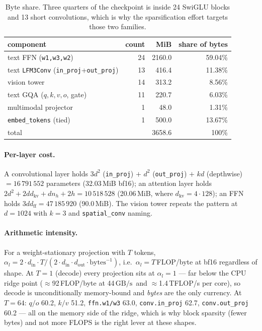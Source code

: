 \documentclass[11pt]{article}
\newcommand{\dff}{\ensuremath{d_{\mathrm{ff}}}}
\newcommand{\code}[1]{\texttt{\small #1}}
\newcommand{\gbps}{\ensuremath{\,\mathrm{GB/s}}}
\begin{document}
\begin{table}[h]\centering\small
\begin{tabular}{lrrr}
\toprule
component & count & MiB & share of bytes \\
\midrule
text FFN (\code{w1,w3,w2}) & 24 & 2160.0 & 59.04\% \\
text \code{LFM3Conv} (\code{in\_proj}+\code{out\_proj}) & 13 & 416.4 & 11.38\% \\
vision tower & 14 & 313.2 & 8.56\% \\
text GQA ($q,k,v,o$, gate) & 11 & 220.7 & 6.03\% \\
multimodal projector & 1 & 48.0 & 1.31\% \\
\code{embed\_tokens} (tied) & 1 & 500.0 & 13.67\% \\
\midrule
total & & 3658.6 & 100\% \\
\bottomrule
\end{tabular}
\caption{Byte share. Three quarters of the checkpoint is inside 24 SwiGLU blocks and 13
short convolutions, which is why the sparsification effort targets those two families.}
\end{table}

\paragraph{Per-layer cost.} A convolutional layer holds $3d^2$ (\code{in\_proj}) $+$ $d^2$
(\code{out\_proj}) $+$ $kd$ (depthwise) $=16\,791\,552$ parameters (32.03\,MiB bf16); an
attention layer holds $2d^2 + 2dd_{\mathrm{kv}} + d n_h + 2h = 10\,518\,528$ (20.06\,MiB,
where $d_{\mathrm{kv}}=4\cdot128$); an FFN holds $3d\dff = 47\,185\,920$ (90.0\,MiB).
The vision tower repeats the pattern at $d=1024$ with $k=3$ and \code{spatial\_conv}
naming.

\paragraph{Arithmetic intensity.} For a weight-stationary projection with $T$ tokens,
$\alpha_l = 2 \cdot d_{\mathrm{in}} \cdot T / (2 \cdot d_{\mathrm{in}} \cdot
d_{\mathrm{out}} \cdot \text{bytes}^{-1})$, i.e.\ $\alpha_l = T$\,FLOP/byte at bf16
regardless of shape. At $T{=}1$ (decode) every projection sits at
$\alpha_l = 1$ --- far below the CPU ridge point ($\approx$92\,FLOP/byte at
44\gbps\ and $\approx$1.4\,TFLOP/s per core), so decode is unconditionally memory-bound
and \emph{bytes} are the only currency. At $T{=}64$: $q/o$ 60.2, $k/v$ 51.2,
\code{ffn.w1/w3} 63.0, \code{conv.in\_proj} 62.7, \code{conv.out\_proj} 60.2 --- all on
the memory side of the ridge, which is why block sparsity (fewer bytes) and not more
FLOPS is the right lever at these shapes.
\end{document}
